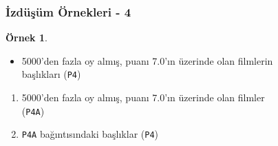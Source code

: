 \documentclass[dvipsnames]{beamer}
\theoremstyle{definition}
\theoremstyle{example}
\newtheorem{ornek}[theorem]{Örnek}
\theoremstyle{plain}
\begin{document}
\begin{frame}
  \frametitle{İzdüşüm Örnekleri - 4}

  \begin{ornek}
    \begin{itemize}
      \item 5000'den fazla oy almış, puanı 7.0'ın üzerinde olan filmlerin\\
        başlıkları (\texttt{P4})
    \end{itemize}

    \pause
    \begin{enumerate}
      \item 5000'den fazla oy almış, puanı 7.0'ın üzerinde olan filmler\\
        (\texttt{P4A})

      \pause
      \item \texttt{P4A} bağıntısındaki başlıklar (\texttt{P4})
    \end{enumerate}
  \end{ornek}
\end{frame}
\end{document}
